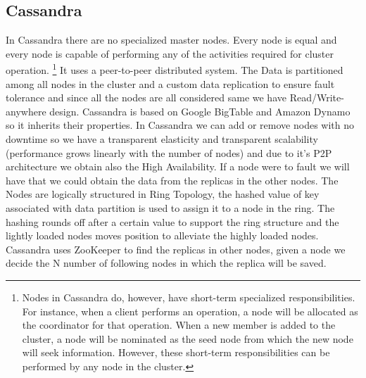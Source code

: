 \documentclass[a4page, 11pt]{article}
\begin{document}
\subsection{Cassandra}
In Cassandra there are no specialized master nodes. Every node is equal and every node is capable of performing any of the activities required for cluster operation. \footnote{Nodes in Cassandra do, however, have short-term specialized responsibilities. For instance, when a client performs an operation, a node will be allocated as the coordinator for that operation. When a new member is added to the cluster, a node will be nominated as the seed node from which the new node will seek information. However, these short-term responsibilities can be performed by any node in the cluster.}
It uses a peer-to-peer distributed system. 
The Data is partitioned among all nodes in the cluster and a custom data replication to ensure fault tolerance and since all the nodes are all considered same we have Read/Write-anywhere design.
Cassandra is based on Google BigTable and Amazon Dynamo so it inherits their properties.
\newline
In Cassandra we can add or remove nodes with no downtime so we have a transparent elasticity and transparent scalability (performance grows linearly with the number of nodes) and due to it's P2P architecture we obtain also the High Availability. If a node were to fault we will have that we could obtain the data from the replicas in the other nodes.
The Nodes are logically structured in Ring Topology, the hashed value of key associated with data partition is used to assign it to a node in the ring. The hashing rounds off after a certain value to support the ring structure and the lightly loaded nodes moves position to alleviate the highly loaded nodes.
Cassandra uses ZooKeeper to find the replicas in other nodes, given a node we decide the N number of following nodes in which the replica will be saved.
\end{document}
